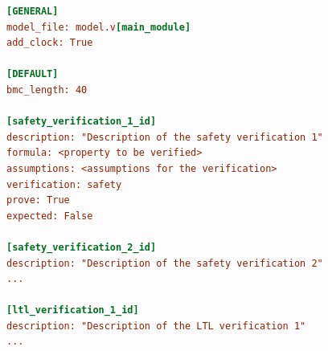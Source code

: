 \documentclass{article}
\theoremstyle{definition}
\begin{document}
\begin{lstlisting}[frame=single,language=Ini,caption=Problem file example,label=problem_file]
[GENERAL]
model_file: model.v[main_module]
add_clock: True

[DEFAULT]
bmc_length: 40

[safety_verification_1_id]
description: "Description of the safety verification 1"
formula: <property to be verified>
assumptions: <assumptions for the verification>
verification: safety
prove: True
expected: False

[safety_verification_2_id]
description: "Description of the safety verification 2"
...

[ltl_verification_1_id]
description: "Description of the LTL verification 1"
...

\end{lstlisting}
\end{document}
